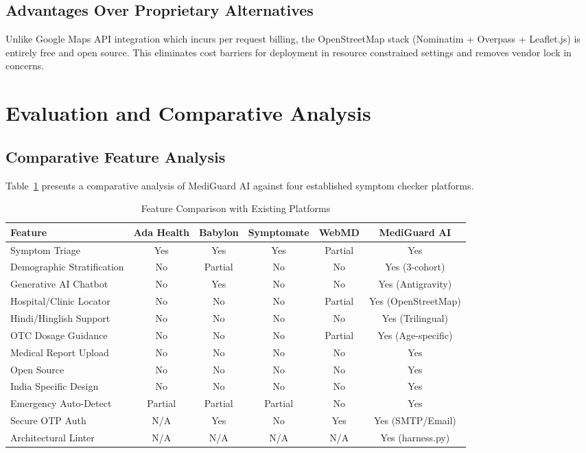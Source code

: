 \documentclass[conference]{IEEEtran}
\begin{document}
\subsection{Advantages Over Proprietary Alternatives}

Unlike Google Maps API integration which incurs per request billing, the OpenStreetMap stack (Nominatim + Overpass + Leaflet.js) is entirely free and open source. This eliminates cost barriers for deployment in resource constrained settings and removes vendor lock in concerns.

\section{Evaluation and Comparative Analysis}

\subsection{Comparative Feature Analysis}

Table~\ref{tab:comparison} presents a comparative analysis of MediGuard AI against four established symptom checker platforms.

\begin{table}[htbp]
\caption{Feature Comparison with Existing Platforms}
\label{tab:comparison}
\centering
\begin{tabular}{|l|c|c|c|c|c|}
\hline
\textbf{Feature} & \textbf{Ada Health} & \textbf{Babylon} & \textbf{Symptomate} & \textbf{WebMD} & \textbf{MediGuard AI} \\
\hline
Symptom Triage & Yes & Yes & Yes & Partial & Yes \\
\hline
Demographic Stratification & No & Partial & No & No & Yes (3-cohort) \\
\hline
Generative AI Chatbot & No & Yes & No & No & Yes (Antigravity) \\
\hline
Hospital/Clinic Locator & No & No & No & Partial & Yes (OpenStreetMap) \\
\hline
Hindi/Hinglish Support & No & No & No & No & Yes (Trilingual) \\
\hline
OTC Dosage Guidance & No & No & No & Partial & Yes (Age-specific) \\
\hline
Medical Report Upload & No & No & No & No & Yes \\
\hline
Open Source & No & No & No & No & Yes \\
\hline
India Specific Design & No & No & No & No & Yes \\
\hline
Emergency Auto-Detect & Partial & Partial & Partial & No & Yes \\
\hline
Secure OTP Auth & N/A & Yes & No & Yes & Yes (SMTP/Email) \\
\hline
Architectural Linter & N/A & N/A & N/A & N/A & Yes (harness.py) \\
\hline
\end{tabular}
\end{table}
\end{document}

